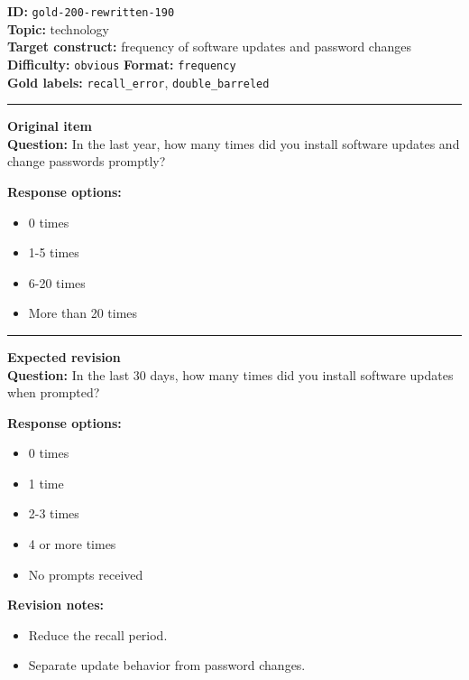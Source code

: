 \documentclass[10pt,a4paper]{article}
\newcommand{\sectionline}{\vspace{0.15em}\hrule\vspace{0.35em}}
\begin{document}
\begin{tcolorbox}[colframe=FlawRed,colback=white,colbacktitle=FlawRed!9,coltitle=black,title={Item 190\hfill Flawed item}]
\textbf{ID:} \texttt{gold-200-rewritten-190}\\
\textbf{Topic:} technology\\
\textbf{Target construct:} frequency of software updates and password changes\\
\textbf{Difficulty:} \texttt{obvious} \quad \textbf{Format:} \texttt{frequency}\\
\textbf{Gold labels:} \texttt{recall\_error}, \texttt{double\_barreled}\\
\sectionline
\textbf{Original item}\\
\textbf{Question:} In the last year, how many times did you install software updates and change passwords promptly?
\par\textbf{Response options:}
\begin{itemize}
\item 0 times
\item 1-5 times
\item 6-20 times
\item More than 20 times
\end{itemize}
\sectionline
\textbf{Expected revision}\\
\textbf{Question:} In the last 30 days, how many times did you install software updates when prompted?
\par\textbf{Response options:}
\begin{itemize}
\item 0 times
\item 1 time
\item 2-3 times
\item 4 or more times
\item No prompts received
\end{itemize}
\par\textbf{Revision notes:}
\begin{itemize}
\item Reduce the recall period.
\item Separate update behavior from password changes.
\end{itemize}
\end{tcolorbox}
\end{document}
